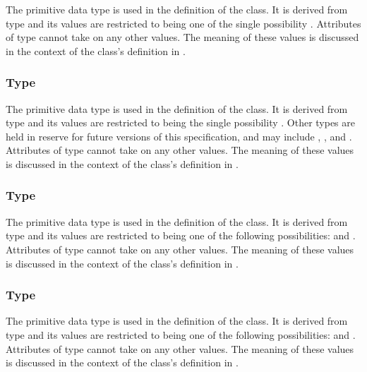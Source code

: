 The  primitive data type is used in the definition of the \AnalyticVolume class.  It is derived from type  and its values are restricted to being one of the single possibility .  Attributes of type  cannot take on any other values.  The meaning of these values is discussed in the context of the \AnalyticVolume class's definition in .


\subsubsection{Type \fixttspace{}}
\label{primtype-GeometryKind}

The  primitive data type is used in the definition of the \Geometry class.  It is derived from type  and its values are restricted to being the single possibility .  Other  types are held in reserve for future versions of this specification, and may include , , and .  Attributes of type  cannot take on any other values.  The meaning of these values is discussed in the context of the \Geometry class's definition in .


\subsubsection{Type \fixttspace{}}
\label{primtype-InterpolationKind}

The  primitive data type is used in the definition of the \SampledField class.  It is derived from type  and its values are restricted to being one of the following possibilities:  and .  Attributes of type  cannot take on any other values.  The meaning of these values is discussed in the context of the \SampledField class's definition in .


\subsubsection{Type \fixttspace{}}
\label{primtype-PolygonKind}

The  primitive data type is used in the definition of the \ParametricObject class.  It is derived from type  and its values are restricted to being one of the following possibilities:  and .  Attributes of type  cannot take on any other values.  The meaning of these values is discussed in the context of the \ParametricObject class's definition in .


